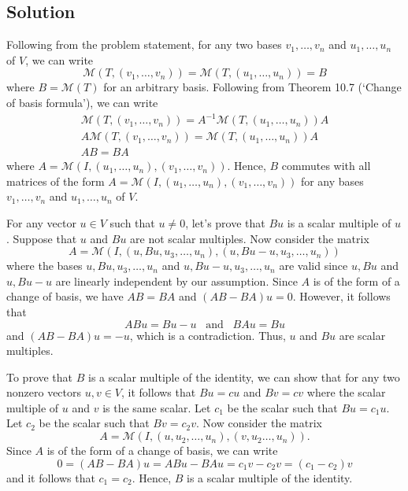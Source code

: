 \documentclass{article}
\begin{document}
\subsection*{Solution}
Following from the problem statement, for any two bases $v_1,\ldots,v_n$ and $u_1,\ldots,u_n$ of $V$, we can write 
\[\mathcal{M}(T,(v_1,\ldots,v_n))=\mathcal{M}(T,(u_1,\ldots,u_n))=B\]
where $B=\mathcal{M}(T)$ for an arbitrary basis. 
Following from Theorem 10.7 (`Change of basis formula'), we can write
\begin{gather*}
    \mathcal{M}(T,(v_1,\ldots,v_n))=A^{-1}\mathcal{M}(T,(u_1,\ldots,u_n))A\\
    A\mathcal{M}(T,(v_1,\ldots,v_n))=\mathcal{M}(T,(u_1,\ldots,u_n))A\\
    AB=BA
\end{gather*}
where $A=\mathcal{M}(I,(u_1,\ldots,u_n),(v_1,\ldots,v_n))$. Hence, $B$ commutes with all matrices of the form $A=\mathcal{M}(I,(u_1,\ldots,u_n),(v_1,\ldots,v_n))$ for any bases $v_1,\ldots,v_n$ and $u_1,\ldots,u_n$ of $V$. 

For any vector $u\in V$ such that $u\neq 0$, let's prove that $Bu$ is a scalar multiple of $u$. Suppose that $u$ and $Bu$ are not scalar multiples. Now consider the matrix
\[A=\mathcal{M}(I,(u,Bu,u_3,\ldots,u_n),(u,Bu-u,u_3,\dots,u_n))\]
where the bases $u,Bu,u_3,\ldots,u_n$ and $u,Bu-u,u_3,\dots,u_n$ are valid since $u,Bu$ and $u,Bu-u$ are linearly independent by our assumption. Since $A$ is of the form of a change of basis, we have $AB=BA$ and $(AB-BA)u=0$. However, it follows that
\[ABu=Bu-u\;\;\;\text{and}\;\;\; BAu=Bu\]
and $(AB-BA)u=-u$, which is a contradiction. Thus, $u$ and $Bu$ are scalar multiples.

To prove that $B$ is a scalar multiple of the identity, we can show that for any two nonzero vectors $u,v\in V$, it follows that $Bu=cu$ and $Bv=cv$ where the scalar multiple of $u$ and $v$ is the same scalar. Let $c_1$ be the scalar such that $Bu=c_1u$. Let $c_2$ be the scalar such that $Bv=c_2v$. Now consider the matrix
\[A=\mathcal{M}(I,(u,u_2,\ldots,u_n),(v,u_2\dots,u_n)).\]
Since $A$ is of the form of a change of basis, we can write
\[0=(AB-BA)u=ABu-BAu=c_1v-c_2v=(c_1-c_2)v\]
and it follows that $c_1=c_2$. Hence, $B$ is a scalar multiple of the identity.
\end{document}
